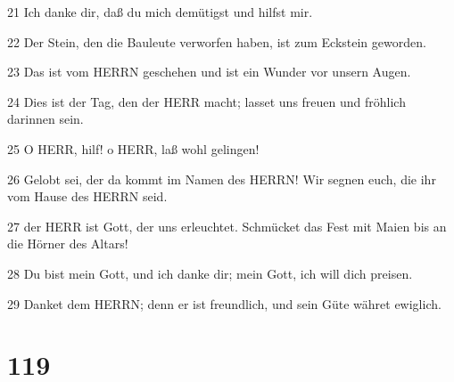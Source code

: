 \par 21 Ich danke dir, daß du mich demütigst und hilfst mir.
\par 22 Der Stein, den die Bauleute verworfen haben, ist zum Eckstein geworden.
\par 23 Das ist vom HERRN geschehen und ist ein Wunder vor unsern Augen.
\par 24 Dies ist der Tag, den der HERR macht; lasset uns freuen und fröhlich darinnen sein.
\par 25 O HERR, hilf! o HERR, laß wohl gelingen!
\par 26 Gelobt sei, der da kommt im Namen des HERRN! Wir segnen euch, die ihr vom Hause des HERRN seid.
\par 27 der HERR ist Gott, der uns erleuchtet. Schmücket das Fest mit Maien bis an die Hörner des Altars!
\par 28 Du bist mein Gott, und ich danke dir; mein Gott, ich will dich preisen.
\par 29 Danket dem HERRN; denn er ist freundlich, und sein Güte währet ewiglich.

\chapter{119}

